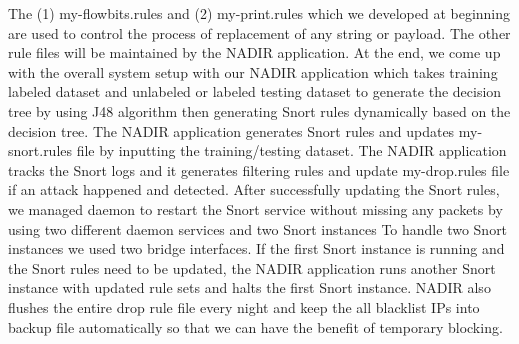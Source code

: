 The (1) my-flowbits.rules and (2) my-print.rules which we developed at beginning are used to control the process of replacement of any string or payload. The other rule files will be maintained by the NADIR application. At the end, we come up with the overall system setup with our NADIR application which takes training labeled dataset and unlabeled or labeled testing dataset to generate the decision tree by using J48 algorithm then generating Snort rules dynamically based on the decision tree. The NADIR application generates Snort rules and updates my-snort.rules file by inputting the training/testing dataset. The NADIR application tracks the Snort logs and it generates filtering rules and update my-drop.rules file if an attack happened and detected. After successfully updating the Snort rules, we managed daemon to restart the Snort service without
missing any packets by using two different daemon services and two Snort instances To handle two Snort instances we used two bridge interfaces. If the first Snort instance is running and the Snort
rules need to be updated, the NADIR application runs another Snort instance with updated rule sets and halts the first Snort instance. NADIR also flushes the entire drop rule file every night and keep the all blacklist IPs into backup file automatically so that we can have the benefit of temporary blocking.
